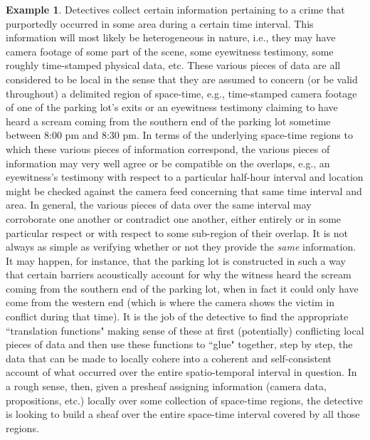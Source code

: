 \documentclass[a4paper]{book}
\theoremstyle{definition}
\newtheorem{example}{Example}[section]
\theoremstyle{definition}
\theoremstyle{definition}
\theoremstyle{theorem}
\theoremstyle{definition}
\begin{document}
\begin{example}
	Detectives collect certain information pertaining to a crime that purportedly occurred in some area during a certain time interval. This information will most likely be heterogeneous in nature, i.e., they may have camera footage of some part of the scene, some eyewitness testimony, some roughly time-stamped physical data, etc. These various pieces of data are all considered to be local in the sense that they are assumed to concern (or be valid throughout) a delimited region of space-time, e.g., time-stamped camera footage of one of the parking lot's exits or an eyewitness testimony claiming to have heard a scream coming from the southern end of the parking lot sometime between 8:00 pm and 8:30 pm. In terms of the underlying space-time regions to which these various pieces of information correspond, the various pieces of information may very well agree or be compatible on the overlaps, e.g., an eyewitness's testimony with respect to a particular half-hour interval and location might be checked against the camera feed concerning that same time interval and area. In general, the various pieces of data over the same interval may corroborate one another or contradict one another, either entirely or in some particular respect or with respect to some sub-region of their overlap. It is not always as simple as verifying whether or not they provide the \textit{same} information. It may happen, for instance, that the parking lot is constructed in such a way that certain barriers acoustically account for why the witness heard the scream coming from the southern end of the parking lot, when in fact it could only have come from the western end (which is where the camera shows the victim in conflict during that time). It is the job of the detective to find the appropriate ``translation functions" making sense of these at first (potentially) conflicting local pieces of data and then use these functions to ``glue" together, step by step, the data that can be made to locally cohere into a coherent and self-consistent account of what occurred over the entire spatio-temporal interval in question. In a rough sense, then, given a presheaf assigning information (camera data, propositions, etc.) locally over some collection of space-time regions, the detective is looking to build a sheaf over the entire space-time interval covered by all those regions.\par 

\end{example}
\end{document}
